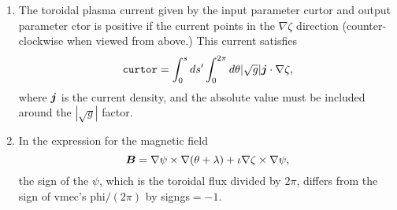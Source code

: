 \documentclass[11pt,letter]{article}
\newcommand{\vect}[1]{\mbox{\boldmath $#1$}}
\begin{document}
\begin{enumerate}
\item
The toroidal plasma current given by the input parameter {\ttfamily curtor} and output parameter {\ttfamily ctor} is positive if the current points in the $\nabla\zeta$ direction
(counter-clockwise when viewed from above.) This current satisfies
\begin{equation}
\mathtt{curtor} = \int_0^s ds' \int_0^{2\pi} d\theta | \sqrt{g}| \vect{j}\cdot\nabla\zeta,
\end{equation}
where $\vect{j}$ is the current density, and the absolute value must be included around the $| \sqrt{g}|$ factor.
\item
In the expression for the magnetic field
\begin{equation}
\vect{B} = \nabla\psi\times\nabla(\theta + \lambda) + \iota \nabla\zeta\times\nabla\psi,
\end{equation}
the sign of the $\psi$, which is the toroidal flux divided by $2\pi$, differs from the sign of vmec's {\ttfamily phi}$/(2\pi)$
by {\ttfamily signgs}$=-1$.
\end{enumerate}

\begin{comment}
\section{Evidence}
Line 273 of {\ttfamily General/bcovar.f: \\
\\
ctor = signgs*twopi*(c1p5*buco(ns) - p5*buco(ns1))
\\
}
where {\ttfamily p5}=0.5 and {\ttfamily c1p5}=1.5.
\end{comment}


%
\end{document}
